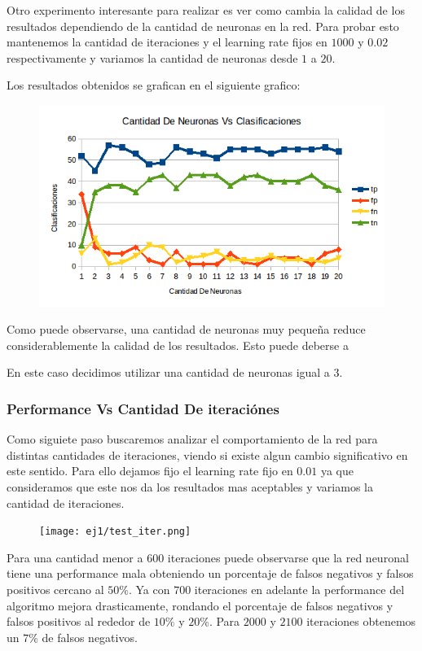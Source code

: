 Otro experimento interesante para realizar es ver como cambia la calidad de los resultados dependiendo de la cantidad de neuronas en la red. Para probar esto mantenemos la cantidad de iteraciones y el learning rate fijos en $1000$ y $0.02$ respectivamente y variamos la cantidad de neuronas desde $1$ a $20$.

Los resultados obtenidos se grafican en el siguiente grafico:

\begin{figure}[h!]
\centering
\includegraphics[scale=0.4]{ej1/test_neuronas.png}
\end{figure}

Como puede observarse, una cantidad de neuronas muy pequeña reduce considerablemente la calidad de los resultados. Esto puede deberse a \completar

En este caso decidimos utilizar una cantidad de neuronas igual a $3$. \porque

\subsubsection{Performance Vs Cantidad De iteraciónes} 

Como siguiete paso buscaremos analizar el comportamiento de la red para distintas cantidades de iteraciones, viendo si existe algun cambio significativo en este sentido. Para ello dejamos fijo el learning rate fijo en $0.01$ ya que consideramos que este nos da los resultados mas aceptables y variamos la cantidad de iteraciones.

\begin{figure}[h!]
  \centering
    \texttt{[image: ej1/test\_iter.png]}
\end{figure}

Para una cantidad menor a $600$ iteraciones puede observarse que la red neuronal tiene una performance mala obteniendo un porcentaje de falsos negativos y falsos positivos cercano al $50\%$. Ya con $700$ iteraciones en adelante la performance del algoritmo mejora drasticamente, rondando el porcentaje de falsos negativos y falsos positivos al rededor de $10 \%$ y $20\%$. Para $2000$ y $2100$ iteraciones obtenemos un $7\%$  de falsos negativos.

